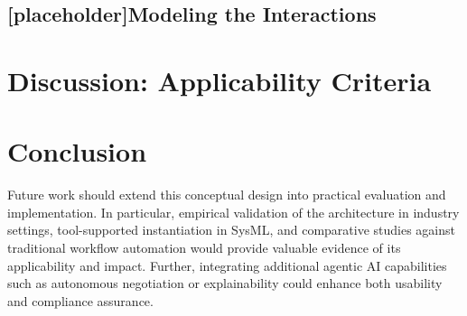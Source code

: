 \subsection{[placeholder]Modeling the Interactions}\label{subsec:mod-interactions}

\section{Discussion: Applicability Criteria}\label{sec:discussion}
    
\section{Conclusion}\label{sec:conclussion}
Future work should extend this conceptual design into practical evaluation and implementation. In particular, empirical validation of the architecture in industry settings, tool-supported instantiation in SysML, and comparative studies against traditional workflow automation would provide valuable evidence of its applicability and impact. Further, integrating additional agentic AI capabilities such as autonomous negotiation or explainability could enhance both usability and compliance assurance.
\clearpage